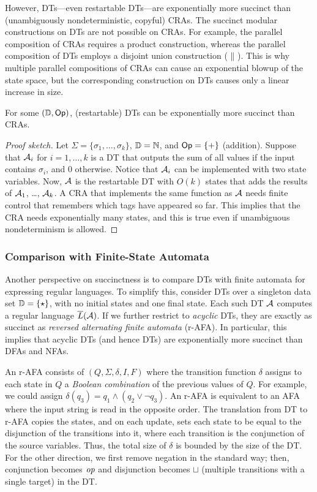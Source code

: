 However, DTs---even restartable DTs---are exponentially more succinct than (unambiguously nondeterministic, copyful) CRAs.
The succinct modular constructions on DTs are not possible on CRAs. For example, the parallel composition of CRAs requires a product construction, whereas the parallel composition of DTs employs a disjoint union construction ($\; \| \;$). This is why multiple parallel compositions of CRAs can cause an exponential blowup of the state space, but the corresponding construction on DTs causes only a linear increase in size.

\begin{theorem}
For some $(\mathbb{D}, \textsf{Op})$, (restartable) DTs can be exponentially more succinct than CRAs.
\end{theorem}
\begin{proof}[Proof sketch]
Let $\Sigma = \{\sigma_1, \ldots, \sigma_k\}$, $\mathbb{D} = \mathbb{N}$, and $\textsf{Op} = \{+\}$ (addition). Suppose that $\mathcal{A}_i$ for $i=1,\ldots,k$ is a DT that outputs the sum of all values if the input contains $\sigma_i$, and $0$ otherwise. Notice that $\mathcal{A}_i$ can be implemented with two state variables. Now, $\mathcal{A}$ is the restartable DT with $O(k)$ states that adds the results of $\mathcal{A}_1$, \ldots, $\mathcal{A}_k$. A CRA that implements the same function as $\mathcal{A}$ needs finite control that remembers which tags have appeared so far. This implies that the CRA needs exponentially many states, and this is true even if unambiguous nondeterminism is allowed.
\end{proof}

\subsubsection{Comparison with Finite-State Automata}
\label{subsec:dts-and-fsa}

Another perspective on succinctness is to compare DTs with finite automata for expressing regular languages.
To simplify this, consider DTs over a singleton data set $\mathbb{D} = \{\star\}$, with no initial states and one final state. Each such DT $\mathcal{A}$ computes a regular language $\overline{L}(\mathcal{A})$.
If we further restrict to \emph{acyclic} DTs, they are exactly as succinct as \emph{reversed alternating finite automata} (r-AFA). In particular, this implies that acyclic DTs (and hence DTs) are exponentially more succinct than  DFAs and NFAs.

An r-AFA \cite{chandra1981alternation,salomaa2000efficient} consists of $(Q, \Sigma, \delta, I, F)$ where the transition function $\delta$ assigns to each state in $Q$ a \emph{Boolean combination} of the previous values of $Q$. For example, we could assign $\delta(q_3) = q_1 \land (q_2 \lor \lnot q_3)$. An r-AFA is equivalent to an AFA where the input string is read in the opposite order.
The translation from DT to r-AFA copies the states, and on each update, sets each state to be equal to the disjunction of the transitions into it, where each transition is the conjunction of the source variables. Thus, the total size of $\delta$ is bounded by the size of the DT.
For the other direction, we first remove negation in the standard way; then, conjunction becomes $\mathit{op}$ and disjunction becomes $\sqcup$ (multiple transitions with a single target) in the DT.

